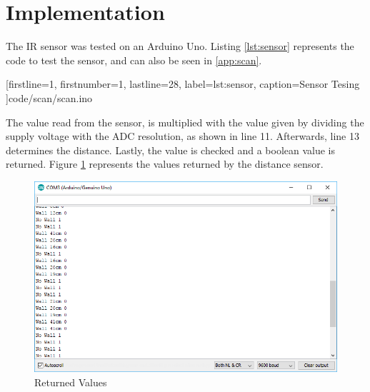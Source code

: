 \newpage
\section{Implementation}\label{sec:scan_implementation}
The IR sensor was tested on an Arduino Uno. Listing \ref{lst:sensor} 
represents the code to test the sensor, and can also be seen in 
\ref{app:scan}.


[firstline=1,
firstnumber=1,
lastline=28,		
label=lst:sensor,
caption={Sensor Tesing}
]{code/scan/scan.ino}

The value read from the sensor, is multiplied with the value given by
dividing the supply voltage with the ADC resolution, as shown in line 11.
Afterwards, line 13 determines the distance.
Lastly, the value is checked and a boolean value is returned.
\clearpage
Figure \ref{fig:arduino_values} represents the values returned by the
distance sensor.

\begin{figure}[htp]
	\centering
	\includegraphics[width=\textwidth]{figures/scan/SerialCom.png}
	\caption{Returned Values}
	\label{fig:arduino_values}
\end{figure}